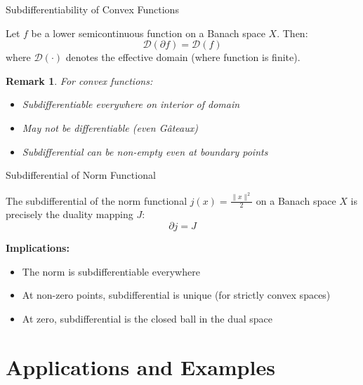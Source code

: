 \documentclass[aspectratio=169,10pt]{beamer}
\newtheorem{remark}[theorem]{Remark}
\begin{document}
\begin{frame}{Subdifferentiability of Convex Functions}
  \begin{theorem}
    Let $f$ be a lower semicontinuous function on a Banach space $X$. Then:
    \[
      \mathcal{D}(\partial f) = \mathcal{D}(f)
    \]
    where $\mathcal{D}(\cdot)$ denotes the effective domain (where function is finite).
  \end{theorem}

  \begin{remark}
    For convex functions:
    \begin{itemize}
      \item Subdifferentiable everywhere on interior of domain
      \item May not be differentiable (even Gâteaux)
      \item Subdifferential can be non-empty even at boundary points
    \end{itemize}
  \end{remark}
\end{frame}

\begin{frame}{Subdifferential of Norm Functional}
  \begin{theorem}[Theorem 3.23]
    The subdifferential of the norm functional $j(x) = \frac{\|x\|^2}{2}$ on a Banach space $X$ is precisely the duality mapping $J$:
    \[
      \partial j = J
    \]
  \end{theorem}

  \textbf{Implications:}
  \begin{itemize}
    \item The norm is subdifferentiable everywhere
    \item At non-zero points, subdifferential is unique (for strictly convex spaces)
    \item At zero, subdifferential is the closed ball in the dual space
  \end{itemize}
\end{frame}


\section{Applications and Examples}
\end{document}
